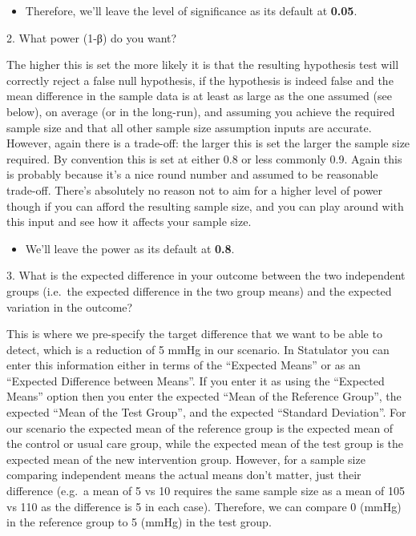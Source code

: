 \documentclass[
]{book}
\providecommand{\tightlist}{%
  \setlength{\itemsep}{0pt}\setlength{\parskip}{0pt}}
\begin{document}
\begin{itemize}
\tightlist
\item
  Therefore, we'll leave the level of significance as its default at \textbf{0.05}.
\end{itemize}

2. What power (1-β) do you want?

The higher this is set the more likely it is that the resulting hypothesis test will correctly reject a false null hypothesis, if the hypothesis is indeed false and the mean difference in the sample data is at least as large as the one assumed (see below), on average (or in the long-run), and assuming you achieve the required sample size and that all other sample size assumption inputs are accurate. However, again there is a trade-off: the larger this is set the larger the sample size required. By convention this is set at either 0.8 or less commonly 0.9. Again this is probably because it's a nice round number and assumed to be reasonable trade-off. There's absolutely no reason not to aim for a higher level of power though if you can afford the resulting sample size, and you can play around with this input and see how it affects your sample size.

\begin{itemize}
\tightlist
\item
  We'll leave the power as its default at \textbf{0.8}.
\end{itemize}

3. What is the expected difference in your outcome between the two independent groups (i.e.~the expected difference in the two group means) and the expected variation in the outcome?

This is where we pre-specify the target difference that we want to be able to detect, which is a reduction of 5 mmHg in our scenario. In Statulator you can enter this information either in terms of the ``Expected Means'' or as an ``Expected Difference between Means''. If you enter it as using the ``Expected Means'' option then you enter the expected ``Mean of the Reference Group'', the expected ``Mean of the Test Group'', and the expected ``Standard Deviation''. For our scenario the expected mean of the reference group is the expected mean of the control or usual care group, while the expected mean of the test group is the expected mean of the new intervention group. However, for a sample size comparing independent means the actual means don't matter, just their difference (e.g.~a mean of 5 vs 10 requires the same sample size as a mean of 105 vs 110 as the difference is 5 in each case). Therefore, we can compare 0 (mmHg) in the reference group to 5 (mmHg) in the test group.
\end{document}
